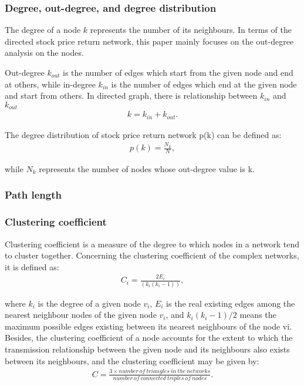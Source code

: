 \subsubsection{Degree, out-degree, and degree distribution}
The degree of a node $k$ represents the number of its neighbours. In terms of the directed stock price return network, this paper mainly focuses on the out-degree analysis on the nodes.

Out-degree $k_{out}$ is the number of edges which start from the given node and end at others, while in-degree $k_{in}$ is the number of edges which end at the given node and start from others. In directed graph, there is relationship between $k_{in}$ and $k_{out}$
\begin{eqnarray}
k=k_{in}+k_{out}.
\end{eqnarray}

The degree distribution of stock price return network p(k) can be defined as:
\begin{eqnarray}
p(k)=\frac{N_k}{N},
\end{eqnarray}

while $N_k$ represents the number of nodes whose out-degree value is k.

\subsubsection{Path length}

\subsubsection{Clustering coefficient} %
Clustering coefficient is a measure of the degree to which nodes in a network tend to cluster together. Concerning the clustering coefficient of the complex networks, it is defined as:
\begin{eqnarray}
C_i=\frac{2E_i}{(k_i(k_i-1))},
\end{eqnarray}

where $k_i$ is the degree of a given node $v_i$, $E_i$ is the real existing edges among the nearest neighbour nodes of the given node $v_i$, and $k_i(k_i-1)/2$ means the maximum possible edges existing between its nearest neighbours of the node vi. Besides, the clustering coefficient of a node accounts for the extent to which the transmission relationship between the given node and its neighbours also exists between its neighbours, and the clustering coefficient may be given by:
\begin{eqnarray}
C=\frac{3\times number\ of\ triangles\ in\ the\ networks}{number\ of\ connected\ triples\ of\ nodes}.
\end{eqnarray}

